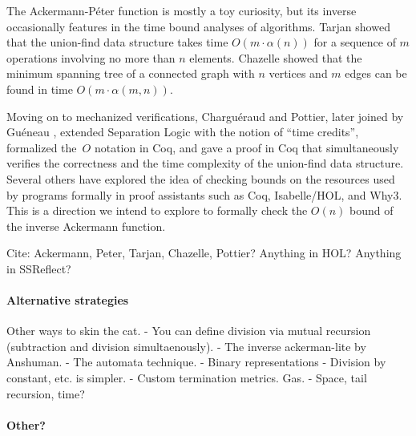 The Ackermann-Péter function is mostly a toy curiosity, but its inverse 
occasionally features in the time bound analyses of algorithms. 
Tarjan \cite{tarjan} showed that the union-find data structure
takes time $O(m\cdot\alpha(n))$ for a sequence of $m$ operations
involving no more than $n$ elements. 
Chazelle \cite{chazelle} showed that the minimum spanning tree
of a connected graph with $n$ vertices and $m$ edges 
can be found in time $O(m\cdot\alpha(m,n))$.

Moving on to mechanized verifications, Charguéraud and Pottier,
\cite{charpott} later joined by Guéneau \cite{gueneauetal}, 
extended Separation Logic with the notion of ``time credits'',
formalized the~$O$ notation in Coq, 
and gave a proof in Coq that simultaneously verifies the correctness
and the time complexity of the union-find data structure. Several others 
\cite{someoftheabove} have explored the idea of checking bounds on the resources
used by programs formally in proof assistants such as Coq, Isabelle/HOL, and Why3.
{\color{magenta}This is a direction
we intend to explore to formally check the $O(n)$ bound
of the inverse Ackermann function.}

Cite: Ackermann, Peter, Tarjan, Chazelle, Pottier? Anything in HOL? Anything in SSReflect?

\paragraph*{Alternative strategies}

Other ways to skin the cat.
- You can define division via mutual recursion (subtraction and division simultaenously).
- The inverse ackerman-lite by Anshuman.  
- The automata technique. 
- Binary representations
- Division by constant, etc. is simpler.
- Custom termination metrics.  Gas. 
- Space, tail recursion, time?

\paragraph*{Other?}
